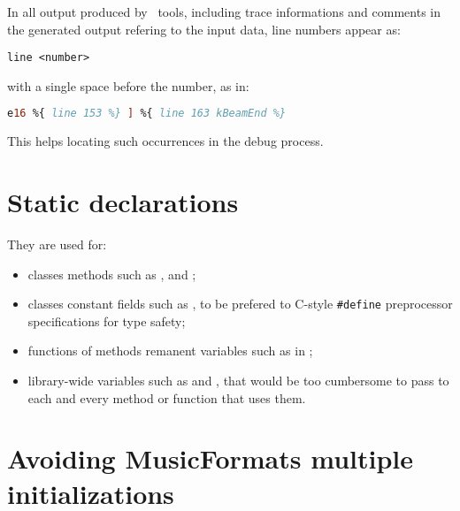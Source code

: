 In all output produced by \mf\ tools, including trace informations and comments in the generated output refering to the input data, line numbers appear as:
\begin{lstlisting}[language=Terminal]
	line <number>
\end{lstlisting}
with a single space before the number, as in:
\begin{lstlisting}[language=Lilypond]
	e16 %{ line 153 %} ] %{ line 163 kBeamEnd %}
\end{lstlisting}

This helps locating such occurrences in the debug process.


\section{Static declarations}

They are used for:
\begin{itemize}
\item classes methods such as ,  and ;

\item classes constant fields such as , to be prefered to C-style {\tt \#define} preprocessor specifications for type safety;

\item functions of methods remanent variables such as  in ;

\item library-wide variables such as  and , that would be too cumbersome to pass to each and every method or function that uses them.
\end{itemize}


\section{Avoiding MusicFormats multiple initializations}

